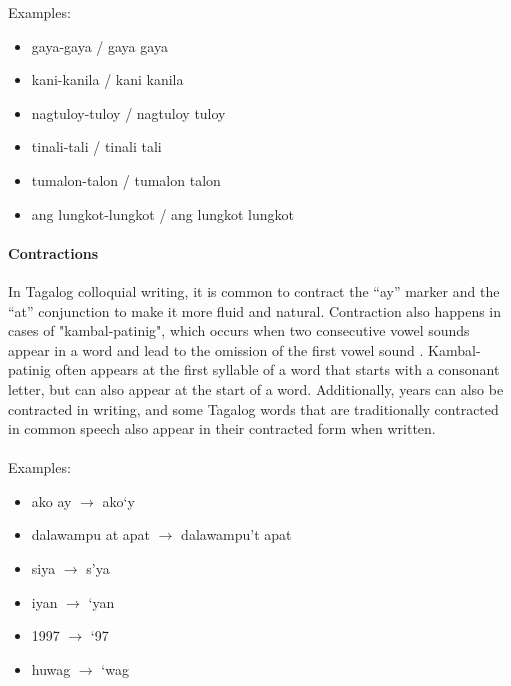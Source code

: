 \documentclass[journal]{./IEEE/IEEEtran}
\begin{document}
Examples: \\


    \begin{itemize}
      \item gaya-gaya / gaya gaya \\
      \item kani-kanila / kani kanila \\
      \item nagtuloy-tuloy / nagtuloy tuloy \\
      \item tinali-tali / tinali tali \\
      \item tumalon-talon / tumalon talon \\
      \item ang lungkot-lungkot / ang lungkot lungkot \\
    \end{itemize}
    
\paragraph{Contractions}

In Tagalog colloquial writing, it is common to contract the “ay” marker and the “at” conjunction to make it more fluid and natural. Contraction also happens in cases of "kambal-patinig", which occurs when two consecutive vowel sounds appear in a word and lead to the omission of the first vowel sound {\cite{KWFManwal}}. Kambal-patinig often appears at the first syllable of a word that starts with a consonant letter, but can also appear at the start of a word. Additionally, years can also be contracted in writing, and some Tagalog words that are traditionally contracted in common speech also appear in their contracted form when written. \\ \\

Examples:

\begin{multicols}{2}
    \begin{itemize}
      \item ako ay $\rightarrow$ ako‘y \\
      \item dalawampu at apat $\rightarrow$ dalawampu’t apat  \\
      \item siya $\rightarrow$ s’ya \\
      \item iyan $\rightarrow$ ‘yan \\
      \item 1997 $\rightarrow$ ‘97 \\
      \item huwag $\rightarrow$ ‘wag \\
    \end{itemize}
\end{multicols}
\end{document}
